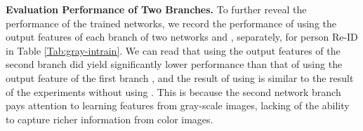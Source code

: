 \documentclass[journal]{IEEEtran}
\newcommand{\myparagraph}[1]{\noindent\textbf{#1.}}
\begin{document}
\begin{table}
\caption{Illustration for the model performance with different   on Market-1501.}


\begin{center}
\end{center}

\label{Tab:d and theta}
\end{table}











































\myparagraph{Evaluation Performance of Two Branches}
To further reveal the performance of the trained networks, we record the performance of using the output features of each branch of two networks  and , separately, for person Re-ID in Table \ref{Tab:gray-intrain}. 
We can read that using the output features of the second branch  did yield significantly lower performance than that of using the output feature of the first branch , and the result of using  is similar to the result of the experiments without using . 
This is because the second network branch pays attention to learning features from gray-scale images, lacking of the ability to capture richer information from color images. 
\end{document}
